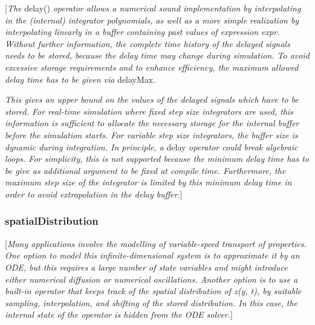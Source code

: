 \documentclass[10pt,a4paper]{report}
\def\doublelabel#1{\label{#1}\hypertarget{#1}{}}
\begin{document}
{[}\emph{The} delay() \emph{operator allows a numerical sound
implementation by interpolating in the (internal) integrator
polynomials, as well as a more simple realization by interpolating
linearly in a buffer containing past values of expression expr. Without
further information, the complete time history of the delayed signals
needs to be stored, because the delay time may change during simulation.
To avoid excessive storage requirements and to enhance efficiency, the
maximum allowed delay time has to be given via} delayMax\emph{. }

\emph{This gives an upper bound on the values of the delayed signals
which have to be stored. For real-time simulation where fixed step size
integrators are used, this information is sufficient to allocate the
necessary storage for the internal buffer before the simulation starts.
For variable step size integrators, the buffer size is dynamic during
integration. In principle, a} delay \emph{operator could break algebraic
loops. For simplicity, this is not supported because the minimum delay
time has to be give as additional argument to be fixed at compile time.
Furthermore, the maximum step size of the integrator is limited by this
minimum delay time in order to avoid extrapolation in the delay
buffer}.{]}

\subsubsection{spatialDistribution}\doublelabel{spatialdistribution}

{[}\emph{Many applications involve the modelling of variable-speed
transport of properties. One option to model this infinite-dimensional
system is to approximate it by an ODE, but this requires a large number
of state variables and might introduce either numerical diffusion or
numerical oscillations. Another option is to use a built-in operator
that keeps track of the spatial distribution of z(y, t), by suitable
sampling, interpolation, and shifting of the stored distribution. In
this case, the internal state of the operator is hidden from the ODE
solver.}{]}
\end{document}

